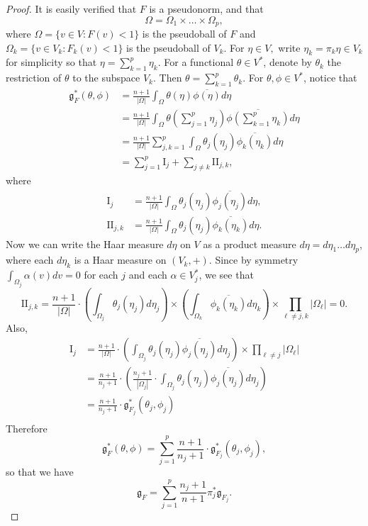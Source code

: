 \documentclass[10pt,a4paper]{amsart}
\newcommand{\abs}[1]{\left\vert#1\right\vert}
\newcommand{\g}{\mathfrak{g}}
\newcommand{\ol}{\overline}
\begin{document}
\begin{proof} It is easily verified that $F$ is a pseudonorm, and that 
\[ \Omega= \Omega_1\times \dots \times \Omega_p,\]
where $\Omega=\{v\in V: F(v)<1\}$ is the pseudoball of $F$ and $\Omega_k=\{v\in V_k: F_k(v)<1\}$ is the pseudoball of $V_k$. For $\eta\in V,$
write $\eta_k=\pi_k\eta\in V_k$ for simplicity so that $\eta= \sum_{k=1}^p \eta_k$. For a functional $\theta\in V^*$, denote by $\theta_k$ the restriction of $\theta$ to the    subspace $V_k$. Then $\theta= \sum_{k=1}^p \theta_k$. For $\theta, \phi\in V^*$, notice that 
\begin{align*}
    \g_F^*(\theta, \phi)&=\frac{n+1}{\abs{\Omega}} \int_\Omega \theta(\eta)\ol{\phi(\eta)}d\eta\\
    &= \frac{n+1}{\abs{\Omega}} \int_\Omega \theta\left(\sum_{j=1}^p \eta_j\right)\ol{\phi\left(\sum_{k=1}^p \eta_k\right)}d\eta\\
    &= \frac{n+1}{\abs{\Omega}} \sum_{j,k=1}^p \int_\Omega \theta_j(\eta_j)\ol{\phi_k(\eta_k)}d\eta\\ 
    &=\sum_{j=1}^p \mathrm{I}_j + \sum_{j\not=k}\mathrm{II}_{j,k}, 
\end{align*}
where 
\begin{align*}
    \mathrm{I}_j&=\frac{n+1}{\abs{\Omega}}\int_\Omega \theta_j(\eta_j)\ol{\phi_j(\eta_j)}d\eta,\\
    \mathrm{II}_{j,k}&= \frac{n+1}{\abs{\Omega}}\int_\Omega \theta_j(\eta_j)\ol{\phi_k(\eta_k)}d\eta.
\end{align*}
Now we can write the Haar measure $d\eta$ on $V$ as a product measure $d\eta=d\eta_1\dots d\eta_p$, where each $d\eta_k$ is a Haar measure on $(V_k,+).$ Since by symmetry $\int_{\Omega_j}\alpha(v)dv=0$ for each $j$ and
each $\alpha\in V_j^*$, we see that 
\[ \mathrm{II}_{j,k}= \frac{n+1}{\abs{\Omega}}\cdot \left(\int_{\Omega_j}\theta_j(\eta_j)d\eta_j\right)\times \left(\int_{\Omega_k}\ol{\phi_k(\eta_k)}d\eta_k \right)\times \prod_{\ell\not=j,k} \abs{\Omega_\ell}=0.\]
Also,
\begin{align*}
    \mathrm{I}_j&= \frac{n+1}{\abs{\Omega}}\cdot \left(\int_{\Omega_j}\theta_j(\eta_j)\ol{\phi_j(\eta_j) }d\eta_j\right)\times \prod_{\ell\not=j} \abs{\Omega_\ell}\\
    &= \frac{n+1}{n_j+1}\cdot\left(\frac{n_j+1}{\abs{\Omega_j}}\cdot \int_{\Omega_j}\theta_j(\eta_j)\ol{\phi_j(\eta_j) }d\eta_j \right)\\
    &=\frac{n+1}{n_j+1}\cdot \g_{F_j}^*(\theta_j,\phi_j)\\
    \end{align*}
Therefore
\[  \g_F^*(\theta, \phi)= \sum_{j=1}^p \frac{n+1}{n_j+1}\cdot \g_{F_j}^*(\theta_j,\phi_j),\]
so that  we have
\[ \g_F= \sum_{j=1}^p\frac{n_j+1}{n+1} \pi_j^*\g_{F_j}. \] 
\end{proof}   
\end{document}
